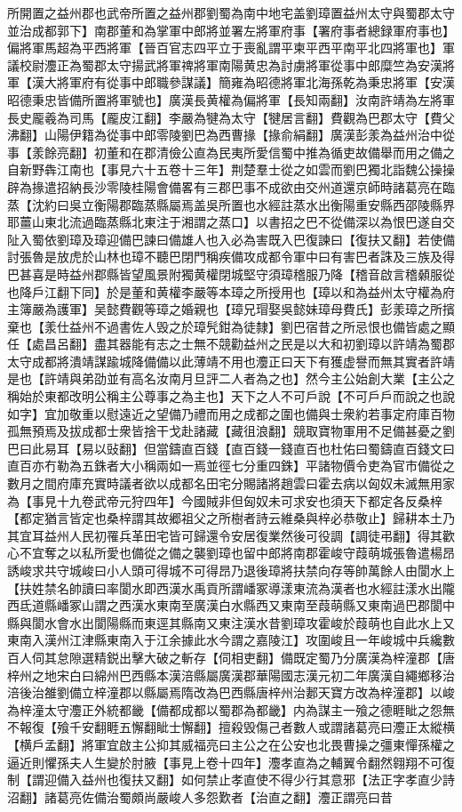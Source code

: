 所開置之益州郡也武帝所置之益州郡劉蜀為南中地宅盖劉璋置益州太守與蜀郡太守並治成都郭下】南郡董和為掌軍中郎將並署左將軍府事【署府事者總録軍府事也】偏將軍馬超為平西將軍【晉百官志四平立于喪亂謂平柬平西平南平北四將軍也】軍議校尉灋正為蜀郡太守揚武將軍禆將軍南陽黄忠為討虜將軍從事中郎糜竺為安漢將軍【漢大將軍府有從事中郎職參謀議】簡雍為昭德將軍北海孫乾為秉忠將軍【安漢昭德秉忠皆備所置將軍號也】廣漢長黄權為偏將軍【長知兩翻】汝南許靖為左將軍長史龎羲為司馬【龎皮江翻】李嚴為犍為太守【犍居言翻】費觀為巴郡太守【費父沸翻】山陽伊籍為從事中郎零陵劉巴為西曹掾【掾俞絹翻】廣漢彭羕為益州治中從事【羕餘亮翻】初董和在郡清儉公直為民夷所愛信蜀中推為循吏故備舉而用之備之自新野犇江南也【事見六十五卷十三年】荆楚羣士從之如雲而劉巴獨北詣魏公操操辟為掾遣招納長沙零陵桂陽會備畧有三郡巴事不成欲由交州道還京師時諸葛亮在臨蒸【沈約曰吳立衡陽郡臨蒸縣屬焉盖吳所置也水經註蒸水出衡陽重安縣西邵陵縣界耶薑山東北流過臨蒸縣北東注于湘謂之蒸口】以書招之巴不從備深以為恨巴遂自交阯入蜀依劉璋及璋迎備巴諫曰備雄人也入必為害既入巴復諫曰【復扶又翻】若使備討張魯是放虎於山林也璋不聽巴閉門稱疾備攻成都令軍中曰有害巴者誅及三族及得巴甚喜是時益州郡縣皆望風景附獨黄權閉城堅守須璋稽服乃降【稽音啟言稽顙服從也降戶江翻下同】於是董和黄權李嚴等本璋之所授用也【璋以和為益州太守權為府主簿嚴為護軍】吴懿費觀等璋之婚親也【璋兄瑁娶吳懿妹璋母費氏】彭羕璋之所擯棄也【羕仕益州不過書佐人毁之於璋髠鉗為徒隸】劉巴宿昔之所忌恨也備皆處之顯任【處昌呂翻】盡其器能有志之士無不競勸益州之民是以大和初劉璋以許靖為蜀郡太守成都將潰靖謀踰城降備備以此薄靖不用也灋正曰天下有獲虚譽而無其實者許靖是也【許靖與弟劭並有高名汝南月旦評二人者為之也】然今主公始創大業【主公之稱始於東都改明公稱主公尊事之為主也】天下之人不可戶說【不可戶戶而說之也說如字】宜加敬重以慰遠近之望備乃禮而用之成都之圍也備與士衆約若事定府庫百物孤無預焉及拔成都士衆皆捨干戈赴諸藏【藏徂浪翻】競取寶物軍用不足備甚憂之劉巴曰此易耳【易以䜴翻】但當鑄直百錢【直百錢一錢直百也杜佑曰蜀鑄直百錢文曰直百亦冇勒為五銖者大小稱兩如一焉並徑七分重四銖】平諸物價令吏為官市備從之數月之間府庫充實時議者欲以成都名田宅分賜諸將趙雲曰霍去病以匈奴未滅無用家為【事見十九卷武帝元狩四年】今國賊非但匈奴未可求安也須天下都定各反桑梓【都定猶言皆定也桑梓謂其故郷祖父之所樹者詩云維桑與梓必恭敬止】歸耕本土乃其宜耳益州人民初罹兵革田宅皆可歸還令安居復業然後可役調【調徒弔翻】得其歡心不宜奪之以私所愛也備從之備之襲劉璋也留中郎將南郡霍峻守葭萌城張魯遣楊昂誘峻求共守城峻曰小人頭可得城不可得昂乃退後璋將扶禁向存等帥萬餘人由閬水上【扶姓禁名帥讀曰率閬水即西漢水禹貢所謂嶓冢導漾東流為漢者也水經註漾水出隴西氐道縣嶓冢山謂之西漢水東南至廣漢白水縣西又東南至葭萌縣又東南過巴郡閬中縣與閬水會水出閬陽縣而東逕其縣南又東注漢水昔劉璋攻霍峻於葭萌也自此水上又東南入漢州江津縣東南入于江余據此水今謂之嘉陵江】攻圍峻且一年峻城中兵纔數百人伺其怠隙選精鋭出擊大破之斬存【伺相吏翻】備既定蜀乃分廣漢為梓潼郡【唐梓州之地宋白曰綿州巴西縣本漢涪縣屬廣漢郡華陽國志漢元初二年廣漢自繩鄉移治涪後治雒劉備立梓潼郡以縣屬焉隋改為巴西縣唐梓州治郪天寶方改為梓潼郡】以峻為梓潼太守灋正外統都畿【備都成都以蜀郡為都畿】内為謀主一飱之德睚眦之怨無不報復【飱千安翻睚五懈翻眦士懈翻】擅殺毁傷己者數人或謂諸葛亮曰灋正太縱横【横戶孟翻】將軍宜啟主公抑其威福亮曰主公之在公安也北畏曹操之彊東憚孫權之逼近則懼孫夫人生變於肘腋【事見上卷十四年】灋孝直為之輔翼令翻然翱翔不可復制【謂迎備入益州也復扶又翻】如何禁止孝直使不得少行其意邪【法正字孝直少詩沼翻】諸葛亮佐備治蜀頗尚嚴峻人多怨歎者【治直之翻】灋正謂亮曰昔